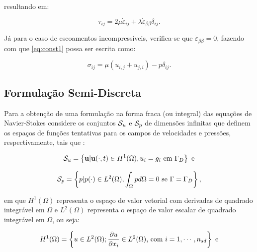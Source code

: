 \noindent resultando em:

\begin{equation}
    \tau_{ij}=2\mu\dot{\varepsilon}_{ij}+\lambda\dot{\varepsilon}_{\beta\beta}\delta_{ij}\text{.}
\end{equation}

Já para o caso de escoamentos incompressíveis, verifica-se que $\dot{\varepsilon}_{\beta\beta}=0$, fazendo com que \ref{eq:const1} possa ser escrita como:

\begin{equation}
    \sigma_{ij}=\mu(u_{i,j}+u_{j,i})-p\delta_{ij}\text{.}\label{eq:ModConst}
\end{equation}

\subsection{Formulação Semi-Discreta} \label{FSD}

Para a obtenção de uma formulação na forma fraca (ou integral) das equações de Navier-Stokes considere os conjuntos $\mathcal{S}_u$ e $\mathcal{S}_p$ de dimensões infinitas que definem os espaços de funções tentativas para os campos de velocidades e pressões, respectivamente, tais que \cite{bazilevs2013computational,fernandes2020tecnica}:

\begin{equation}
    \mathcal{S}_u=\left\{\mathbf{u}|\mathbf{u}(\cdot,t)\in H^1(\Omega),u_i=g_i\text{ em }\Gamma_D\right\}\text{ e}
\end{equation}

\begin{equation}
    \mathcal{S}_p=\left\{p|p(\cdot)\in L^2(\Omega),\int_\Omega{pd\Omega}=0\text{ se }\Gamma=\Gamma_D\right\}\text{,}
\end{equation}

\noindent em que $H^1(\Omega)$ representa o espaço de valor vetorial com derivadas de quadrado integrável em $\Omega$ e $L^2(\Omega)$ representa o espaço de valor escalar de quadrado integrável em $\Omega$, ou seja:

\begin{equation}
    H^1(\Omega)=\left\{u\in L^2(\Omega);\frac{\partial{u}}{\partial{x_i}}\in L^2(\Omega)\text{, com }i=1,\cdots,n_{sd}\right\}\text{ e}
\end{equation}

